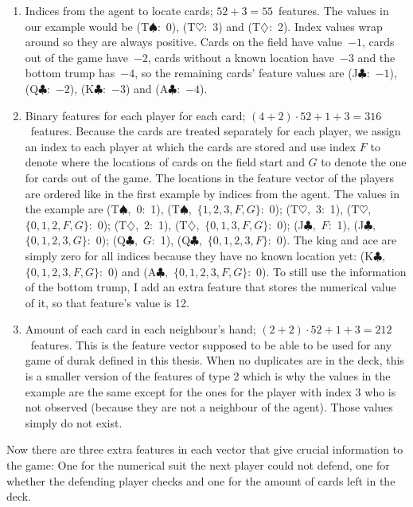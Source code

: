 \documentclass[a4paper,titlepage]{article}
\begin{document}
\begin{enumerate}
  \item Indices from the agent to locate cards; $52 + 3 = 55$~features. The values in our example would be (T$\spadesuit$:~0), (T$\heartsuit$:~3) and (T$\diamondsuit$:~2). Index values wrap around so they are always positive. Cards on the field have value~$-1$, cards out of the game have~$-2$, cards without a known location have~$-3$ and the bottom trump has~$-4$, so the remaining cards' feature values are (J$\clubsuit$:~$-1$), (Q$\clubsuit$:~$-2$), (K$\clubsuit$:~$-3$) and (A$\clubsuit$:~$-4$).
  \item Binary features for each player for each card; $(4 + 2) \cdot 52  + 1 + 3 = 316$~features. Because the cards are treated separately for each player, we assign an index to each player at which the cards are stored and use index $F$ to denote where the locations of cards on the field start and $G$ to denote the one for cards out of the game. The locations in the feature vector of the players are ordered like in the first example by indices from the agent. The values in the example are (T$\spadesuit$,~0:~1), (T$\spadesuit$,~$\{1, 2, 3, F, G\}$:~0); (T$\heartsuit$,~3:~1), (T$\heartsuit$,~$\{0, 1, 2, F, G\}$:~0); (T$\diamondsuit$,~2:~1), (T$\diamondsuit$,~$\{0, 1, 3, F, G\}$:~0); (J$\clubsuit$,~$F$:~1), (J$\clubsuit$,~$\{0, 1, 2, 3, G\}$:~0); (Q$\clubsuit$,~$G$:~1), (Q$\clubsuit$,~$\{0, 1, 2, 3, F\}$:~0).
  The king and ace are simply zero for all indices because they have no known location yet: (K$\clubsuit$,~$\{0, 1, 2, 3, F, G\}$:~0) and (A$\clubsuit$,~$\{0, 1, 2, 3, F, G\}$:~0). To still use the information of the bottom trump, I add an extra feature that stores the numerical value of it, so that feature's value is 12.
  \item Amount of each card in each neighbour's hand; $(2 + 2) \cdot 52 + 1 + 3 = 212$~features. This is the feature vector supposed to be able to be used for any game of durak defined in this thesis. When no duplicates are in the deck, this is a smaller version of the features of type 2 which is why the values in the example are the same except for the ones for the player with index 3 who is not observed (because they are not a neighbour of the agent). Those values simply do not exist.
\end{enumerate}
Now there are three extra features in each vector that give crucial information to the game: One for the numerical suit the next player could not defend, one for whether the defending player checks and one for the amount of cards left in the deck.
\end{document}
